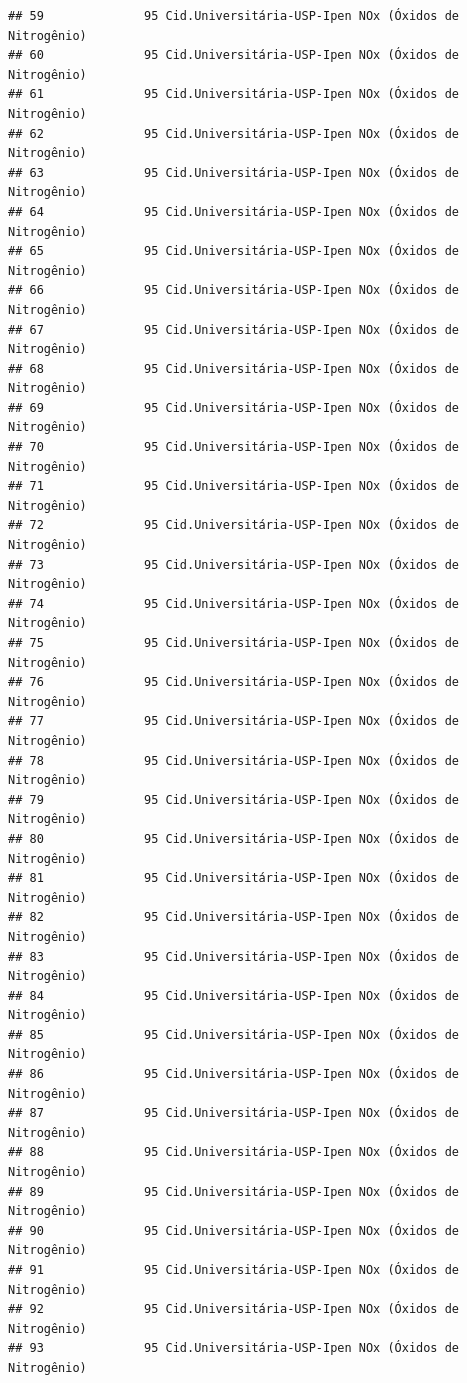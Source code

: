 \documentclass[]{book}
\begin{document}
\begin{verbatim}
## 59              95 Cid.Universitária-USP-Ipen NOx (Óxidos de Nitrogênio)
## 60              95 Cid.Universitária-USP-Ipen NOx (Óxidos de Nitrogênio)
## 61              95 Cid.Universitária-USP-Ipen NOx (Óxidos de Nitrogênio)
## 62              95 Cid.Universitária-USP-Ipen NOx (Óxidos de Nitrogênio)
## 63              95 Cid.Universitária-USP-Ipen NOx (Óxidos de Nitrogênio)
## 64              95 Cid.Universitária-USP-Ipen NOx (Óxidos de Nitrogênio)
## 65              95 Cid.Universitária-USP-Ipen NOx (Óxidos de Nitrogênio)
## 66              95 Cid.Universitária-USP-Ipen NOx (Óxidos de Nitrogênio)
## 67              95 Cid.Universitária-USP-Ipen NOx (Óxidos de Nitrogênio)
## 68              95 Cid.Universitária-USP-Ipen NOx (Óxidos de Nitrogênio)
## 69              95 Cid.Universitária-USP-Ipen NOx (Óxidos de Nitrogênio)
## 70              95 Cid.Universitária-USP-Ipen NOx (Óxidos de Nitrogênio)
## 71              95 Cid.Universitária-USP-Ipen NOx (Óxidos de Nitrogênio)
## 72              95 Cid.Universitária-USP-Ipen NOx (Óxidos de Nitrogênio)
## 73              95 Cid.Universitária-USP-Ipen NOx (Óxidos de Nitrogênio)
## 74              95 Cid.Universitária-USP-Ipen NOx (Óxidos de Nitrogênio)
## 75              95 Cid.Universitária-USP-Ipen NOx (Óxidos de Nitrogênio)
## 76              95 Cid.Universitária-USP-Ipen NOx (Óxidos de Nitrogênio)
## 77              95 Cid.Universitária-USP-Ipen NOx (Óxidos de Nitrogênio)
## 78              95 Cid.Universitária-USP-Ipen NOx (Óxidos de Nitrogênio)
## 79              95 Cid.Universitária-USP-Ipen NOx (Óxidos de Nitrogênio)
## 80              95 Cid.Universitária-USP-Ipen NOx (Óxidos de Nitrogênio)
## 81              95 Cid.Universitária-USP-Ipen NOx (Óxidos de Nitrogênio)
## 82              95 Cid.Universitária-USP-Ipen NOx (Óxidos de Nitrogênio)
## 83              95 Cid.Universitária-USP-Ipen NOx (Óxidos de Nitrogênio)
## 84              95 Cid.Universitária-USP-Ipen NOx (Óxidos de Nitrogênio)
## 85              95 Cid.Universitária-USP-Ipen NOx (Óxidos de Nitrogênio)
## 86              95 Cid.Universitária-USP-Ipen NOx (Óxidos de Nitrogênio)
## 87              95 Cid.Universitária-USP-Ipen NOx (Óxidos de Nitrogênio)
## 88              95 Cid.Universitária-USP-Ipen NOx (Óxidos de Nitrogênio)
## 89              95 Cid.Universitária-USP-Ipen NOx (Óxidos de Nitrogênio)
## 90              95 Cid.Universitária-USP-Ipen NOx (Óxidos de Nitrogênio)
## 91              95 Cid.Universitária-USP-Ipen NOx (Óxidos de Nitrogênio)
## 92              95 Cid.Universitária-USP-Ipen NOx (Óxidos de Nitrogênio)
## 93              95 Cid.Universitária-USP-Ipen NOx (Óxidos de Nitrogênio)

\end{verbatim}
\end{document}
